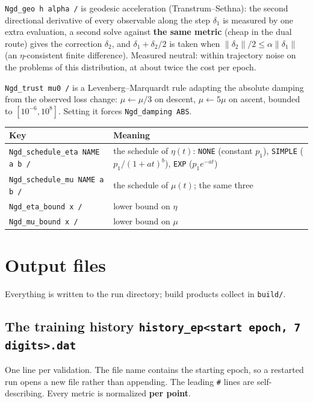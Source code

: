\documentclass[10pt,a4paper]{article}
\newcommand{\code}[1]{\texttt{#1}}
\begin{document}
\code{Ngd\_geo h alpha /} is geodesic acceleration
(Transtrum--Sethna): the second directional derivative of every
observable along the step $\delta_1$ is measured by one extra
evaluation, a second solve against \textbf{the same metric} (cheap in
the dual route) gives the correction $\delta_2$, and
$\delta_1+\delta_2/2$ is taken when $\lVert\delta_2\rVert/2 \le
\alpha\lVert\delta_1\rVert$ (an $\eta$-consistent finite difference).
Measured neutral: within trajectory noise on the problems of this
distribution, at about twice the cost per epoch.

\code{Ngd\_trust mu0 /} is a Levenberg--Marquardt rule adapting the
absolute damping from the observed loss change: $\mu\leftarrow\mu/3$
on descent, $\mu\leftarrow 5\mu$ on ascent, bounded to
$[10^{-6},10^{8}]$. Setting it forces \code{Ngd\_damping ABS}.

\begin{longtable}{@{}p{}p{}@{}}
\toprule
Key & Meaning \\
\midrule
\endhead
\code{Ngd\_schedule\_eta NAME a b /} & the schedule of $\eta(t)$: \code{NONE} (constant $p_1$), \code{SIMPLE} ($p_1/(1+at)^b$), \code{EXP} ($p_1e^{-at}$)\\
\code{Ngd\_schedule\_mu NAME a b /} & the schedule of $\mu(t)$; the same three\\
\code{Ngd\_eta\_bound x /} & lower bound on $\eta$\\
\code{Ngd\_mu\_bound x /} & lower bound on $\mu$\\
\bottomrule
\end{longtable}

\section{Output files}

Everything is written to the run directory; build products collect in
\code{build/}.

\subsection{The training history \code{history\_ep<start epoch, 7 digits>.dat}}

One line per validation. The file name contains the starting epoch,
so a restarted run opens a new file rather than appending. The
leading \code{\#} lines are self-describing. Every metric is
normalized \textbf{per point}.
\end{document}
